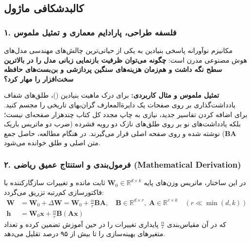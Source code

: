 \subsection{کالبدشکافی ماژول }

\subsubsection*{۱. فلسفه طراحی، پارادایم معماری و تمثیل ملموس}
مکانیزم نوآورانه  پاسخی بنیادین به یکی از حیاتی‌ترین چالش‌های مهندسی مدل‌های هوش مصنوعی مدرن است: \textbf{چگونه می‌توان ظرفیت بازنمایی زبانی مدل را در بالاترین سطح نگه داشت و هم‌زمان هزینه‌های سنگین پردازشی و بن‌بست‌های حافظه سخت‌افزار را مهار کرد؟}

\textbf{تمثیل ملموس و مثال کاربردی:}
برای درک ماهیت بنیادین  ()، طلق‌های شفاف یادداشت‌گذاری بر روی صفحات یک دایرةالمعارف گران‌بهای تاریخی را مجسم کنید. برای اضافه کردن تفاسیر جدید، نیازی به چاپ مجدد کل کتاب چندهزار صفحه‌ای نیست؛ بلکه یادداشت‌های نو بر روی طلق‌های نازک دو رویه فشرده (ضرب دو ماتریس باریک $\mathbf{B} \mathbf{A}$) نوشته شده و روی صفحه اصلی قرار می‌گیرند. در هنگام مطالعه، حاصل جمع متن اصلی و طلق خوانده می‌شود.

\subsubsection*{۲. فرمول‌بندی و استنتاج عمیق ریاضی (Mathematical Derivation)}
در این ساختار، ماتریس وزن‌های پایه $\mathbf{W}_0 \in \mathbb{R}^{d \times k}$ ثابت مانده و تغییرات سازگارکننده با فاکتورسازی کم‌رتبه تزریق می‌گردد:
\begin{align}
\mathbf{W} &= \mathbf{W}_0 + \Delta \mathbf{W} = \mathbf{W}_0 + \frac{\alpha}{r} \mathbf{B} \mathbf{A}, \quad \mathbf{B} \in \mathbb{R}^{d \times r}, \; \mathbf{A} \in \mathbb{R}^{r \times k} \quad (r \ll \min(d, k)) \\
\mathbf{h} &= \mathbf{W}_0 \mathbf{x} + \frac{\alpha}{r} \mathbf{B} (\mathbf{A} \mathbf{x})
\end{align}
که در آن مقیاس‌بندی $\frac{\alpha}{r}$ پایداری تغییرات را در حین آموزش تضمین کرده و تعداد متغیرهای بهینه‌سازی را تا بیش از ۹۵ درصد تقلیل می‌دهد.

